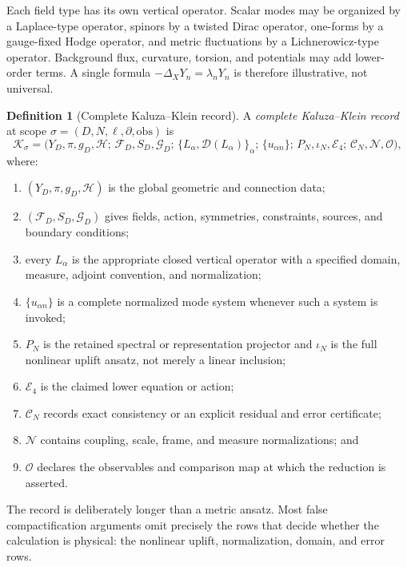 \documentclass[11pt]{article}
\theoremstyle{definition}
\newtheorem{definition}[theorem]{Definition}
\theoremstyle{remark}
\newcommand{\cC}{\mathcal C}
\newcommand{\cD}{\mathcal D}
\newcommand{\cE}{\mathcal E}
\newcommand{\cF}{\mathcal F}
\newcommand{\cG}{\mathcal G}
\newcommand{\cH}{\mathcal H}
\newcommand{\cK}{\mathcal K}
\newcommand{\cN}{\mathcal N}
\newcommand{\cO}{\mathcal O}
\let\MTToriginalitem\item
\renewcommand{\item}{\par\MTToriginalitem}
\begin{document}
Each field type has its own vertical operator.  Scalar modes may be
organized by a Laplace-type operator, spinors by a twisted Dirac operator,
one-forms by a gauge-fixed Hodge operator, and metric fluctuations by a
Lichnerowicz-type operator.  Background flux, curvature, torsion, and
potentials may add lower-order terms.  A single formula
\(-\Delta_XY_n=\lambda_nY_n\) is therefore illustrative, not universal.

\begin{definition}[Complete Kaluza--Klein record]
\label{def:record}
A \emph{complete Kaluza--Klein record} at scope
\(\sigma=(D,N,\ell,\partial,\mathrm{obs})\) is
\[
\cK_\sigma=
\bigl(
Y_D,\pi,g_D,\cH;\,
\cF_D,S_D,\cG_D;\,
\{L_\alpha,\cD(L_\alpha)\}_\alpha;\,
\{u_{\alpha n}\};\,
P_N,\iota_N,\cE_4;\,
\cC_N,\cN,\cO
\bigr),
\]
where:
\begin{enumerate}[label=(\roman*),leftmargin=2em]
\item \((Y_D,\pi,g_D,\cH)\) is the global geometric and connection data;
\item \((\cF_D,S_D,\cG_D)\) gives fields, action, symmetries, constraints,
      sources, and boundary conditions;
\item every \(L_\alpha\) is the appropriate closed vertical operator with a
      specified domain, measure, adjoint convention, and normalization;
\item \(\{u_{\alpha n}\}\) is a complete normalized mode system whenever
      such a system is invoked;
\item \(P_N\) is the retained spectral or representation projector and
      \(\iota_N\) is the full nonlinear uplift ansatz, not merely a linear
      inclusion;
\item \(\cE_4\) is the claimed lower equation or action;
\item \(\cC_N\) records exact consistency or an explicit residual and error
      certificate;
\item \(\cN\) contains coupling, scale, frame, and measure normalizations;
      and
\item \(\cO\) declares the observables and comparison map at which the
      reduction is asserted.
\end{enumerate}
\end{definition}

The record is deliberately longer than a metric ansatz.  Most false
compactification arguments omit precisely the rows that decide whether the
calculation is physical: the nonlinear uplift, normalization, domain, and
error rows.
\end{document}
